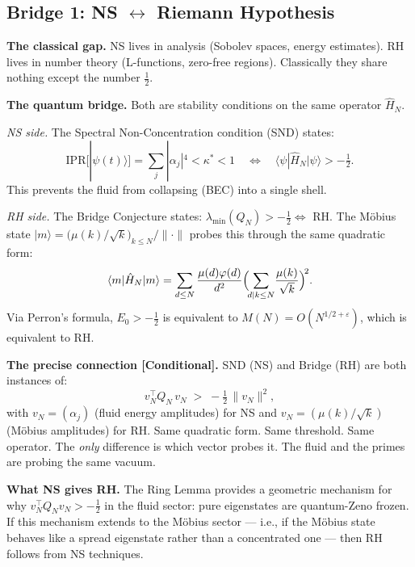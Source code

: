 \documentclass[12pt]{article}
\newcommand{\ket}[1]{|{#1}\rangle}
\newcommand{\bra}[1]{\langle{#1}|}
\newcommand{\half}{\tfrac{1}{2}}
\begin{document}
\subsection{Bridge 1: NS $\longleftrightarrow$ Riemann Hypothesis}
\label{sec:bridge-rh}

\textbf{The classical gap.}
NS lives in analysis (Sobolev spaces, energy estimates).
RH lives in number theory (L-functions, zero-free regions).
Classically they share nothing except the number $\half$.

\textbf{The quantum bridge.}
Both are stability conditions on the same operator $\hat{H}_N$.

\medskip
\noindent\textit{NS side.}
The Spectral Non-Concentration condition (SND) states:
\[
  \mathrm{IPR}[\ket{\psi(t)}] = \sum_j|\alpha_j|^4 < \kappa^* < 1
  \quad\Longleftrightarrow\quad
  \bra{\psi}\hat{H}_N\ket{\psi} > -\half.
\]
This prevents the fluid from collapsing (BEC) into a single shell.

\noindent\textit{RH side.}
The Bridge Conjecture states: $\lambda_{\min}(Q_N) > -\half \Leftrightarrow$ RH.
The M\"{o}bius state
$\ket{m} = \bigl(\mu(k)/\sqrt{k}\bigr)_{k\le N}/\|\cdot\|$
probes this through the same quadratic form:
\[
  \bra{m}\hat{H}_N\ket{m}
  = \sum_{d\le N}\frac{\mu(d)\varphi(d)}{d^2}
    \Bigl(\!\sum_{d|k\le N}\!\frac{\mu(k)}{\sqrt{k}}\Bigr)^{\!2}.
\]
Via Perron's formula, $E_0 > -\half$ is equivalent to
$M(N) = O(N^{1/2+\varepsilon})$, which is equivalent to RH.

\begin{tcolorbox}[provedbox]
\textbf{The precise connection [Conditional].}
SND (NS) and Bridge (RH) are both instances of:
\[
  v_N^\top Q_N\, v_N \;>\; -\half\,\|v_N\|^2,
\]
with $v_N = (\alpha_j)$ (fluid energy amplitudes) for NS
and $v_N = (\mu(k)/\sqrt{k})$ (M\"{o}bius amplitudes) for RH.
Same quadratic form.  Same threshold.  Same operator.
The \emph{only} difference is which vector probes it.
The fluid and the primes are probing the same vacuum.
\end{tcolorbox}

\textbf{What NS gives RH.}
The Ring Lemma provides a geometric mechanism for why
$v_N^\top Q_N v_N > -\half$ in the fluid sector:
pure eigenstates are quantum-Zeno frozen.
If this mechanism extends to the M\"{o}bius sector ---
i.e., if the M\"{o}bius state behaves like a spread eigenstate
rather than a concentrated one ---
then RH follows from NS techniques.
\end{document}
